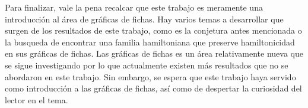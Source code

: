 Para finalizar, vale la pena recalcar que este trabajo es meramente una
introducci\'on al \'area de gr\'aficas de fichas. Hay varios temas a desarrollar
que surgen de los resultados de este trabajo, como es la conjetura antes
mencionada o la busqueda de encontrar una familia hamiltoniana que preserve
hamiltonicidad en sus gr\'aficas de fichas. Las gr\'aficas de fichas es un
\'area relativamente nueva que se sigue investigando por lo que actualmente
existen m\'as resultados que no se abordaron en este trabajo. Sin embargo, se
espera que este trabajo haya servido como introducci\'on a las gr\'aficas de
fichas, as\'i como de despertar la curiosidad del lector en el tema.

